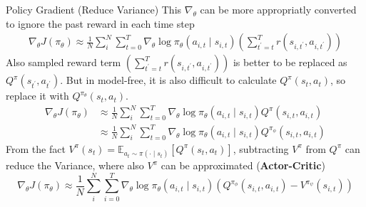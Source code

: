 \documentclass[8pt]{beamer}
\begin{document}
\begin{frame}{Policy Gradient (Reduce Variance)}
    This $\nabla_\theta$ can be more appropriatly converted to ignore the past reward in each time step
    \[
    \begin{aligned}
        \nabla_\theta J(\pi_\theta) \approx \frac{1}{N} \sum_i^N \sum_{t=0}^T \nabla_\theta \log{\pi_\theta}(a_{i, t} \mid s_{i, t}) \left(\sum_{t^\prime=t}^T r(s_{i,t^\prime}, a_{i, t^\prime}) \right)
    \end{aligned}
    \]
    Also sampled reward term $\left(\sum_{t^\prime = t}^T r(s_{i, t^\prime}, a_{i, t^\prime})\right)$ is better to be replaced as $Q^\pi(s_{t^\prime}, a_{t^\prime})$. But in model-free, it is also difficult to calculate $Q^\pi(s_{t}, a_{t})$, so replace it with $Q^{\pi_\theta}(s_t, a_t)$.
    \[
    \begin{aligned}
        \nabla_\theta J(\pi_\theta) &\approx \frac{1}{N} \sum_{i}^N \sum_{t=0}^T \nabla_\theta \log{\pi_\theta}(a_{i, t} \mid s_{i, t}) Q^\pi(s_{i,t}, a_{i,t}) \\
        &\approx \frac{1}{N} \sum_{i}^N \sum_{t=0}^T \nabla_\theta \log{\pi_\theta}(a_{i,t}\mid s_{i,t})Q^{\pi_\phi}(s_{i,t}, a_{i,t})
    \end{aligned}
    \]
    From the fact $V^\pi(s_t) = \mathbb{E}_{a_t \sim \pi(\cdot \mid s_t)}[Q^\pi(s_t, a_t)]$, subtracting $V^\pi$ from $Q^\pi$ can reduce the Variance, where also $V^\pi$ can be approximated (\textbf{Actor-Critic})
    \[
    \nabla_\theta J(\pi_\theta) \approx \frac{1}{N} \sum^N_{i} \sum^T_{i=0}\nabla_\theta \log{\pi_\theta}(a_{i,t}\mid s_{i,t}) (Q^{\pi_\phi} (s_{i,t}, a_{i,t}) - V^{\pi_\psi}(s_{i,t}))
    \]

\end{frame}
\end{document}
